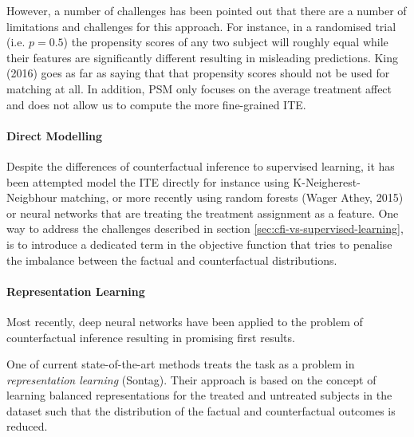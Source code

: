 
However, a number of challenges has been pointed out that there are a number of limitations and challenges for this approach. For instance, in a randomised trial (i.e. $p =0.5$) the propensity scores of any two subject will roughly equal while their features are significantly different resulting in misleading predictions. King (2016) %
goes as far as saying that that propensity scores should not be used for matching at all. In addition, PSM only focuses on the average treatment affect and does not allow us to compute the more fine-grained ITE. 


%

\paragraph{Direct Modelling}
Despite the differences of counterfactual inference to supervised learning, it has been attempted model the ITE directly for instance using K-Neigherest-Neigbhour matching, or more recently using random forests (Wager  Athey, 2015) or neural networks that are treating the treatment assignment as a feature. %
One way to address the challenges described in section \ref{sec:cfi-vs-supervised-learning}, is to introduce a dedicated term in the objective function that tries to penalise the imbalance between the factual and counterfactual distributions.  


\paragraph{Representation Learning}
Most recently, deep neural networks have been applied to the problem of counterfactual inference resulting in promising first results. 

One of current state-of-the-art methods treats the task as a problem in \emph{representation learning} (Sontag). %
Their approach is based on the concept of learning balanced representations for the treated and untreated subjects in the dataset such that the distribution of the factual and counterfactual outcomes is reduced. 

